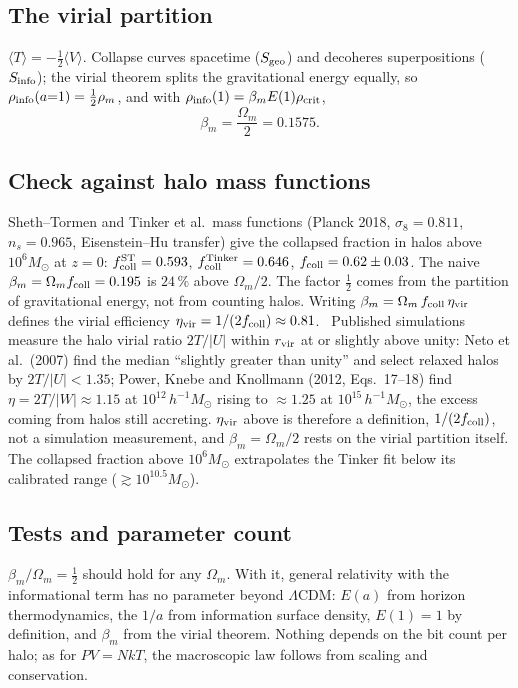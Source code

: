 \subsection{The virial partition}
$\langle T\rangle=-\tfrac12\langle V\rangle$. Collapse curves spacetime ($S_{\rm geo}$) and decoheres superpositions ($S_{\rm info}$); the virial theorem
splits the gravitational energy equally, so $\rho_{\rm info}(a{=}1)=\tfrac12\rho_m$, and with $\rho_{\rm info}(1)=\beta_mE(1)\rho_{\rm crit}$,
\begin{equation}\beta_m=\frac{\Omega_m}{2}=0.1575 .\end{equation}
\subsection{Check against halo mass functions}
Sheth--Tormen and Tinker et al.\ mass functions (Planck 2018, $\sigma_8=0.811$, $n_s=0.965$, Eisenstein--Hu transfer) give the collapsed fraction in halos
above $10^6M_\odot$ at $z=0$: $f^{\rm ST}_{\rm coll}=0.593$, $f^{\rm Tinker}_{\rm coll}=0.646$, $f_{\rm coll}=0.62\pm0.03$. The naive $\beta_m=\Omega_mf_{\rm coll}=0.195$
is $24\,\%$ above $\Omega_m/2$. The factor $\tfrac12$ comes from the partition of gravitational energy, not from counting halos. Writing
$\beta_m=\Omega_m\,f_{\rm coll}\,\eta_{\rm vir}$ defines the virial efficiency $\eta_{\rm vir}=1/(2f_{\rm coll})\approx0.81$.
\observed\ Published simulations measure the halo virial ratio $2T/|U|$ within $r_{\rm vir}$ at or slightly above unity: Neto et al.\ (2007)
find the median ``slightly greater than unity'' and select relaxed halos by $2T/|U|<1.35$; Power, Knebe and Knollmann (2012, Eqs.~17--18) find
$\eta=2T/|W|\approx1.15$ at $10^{12}\,h^{-1}M_\odot$ rising to $\approx1.25$ at $10^{15}\,h^{-1}M_\odot$, the excess coming from halos still accreting.
$\eta_{\rm vir}$ above is therefore a definition, $1/(2f_{\rm coll})$, not a simulation measurement, and $\beta_m=\Omega_m/2$ rests on the virial partition
itself. The collapsed fraction above $10^6M_\odot$ extrapolates the Tinker fit below its calibrated range ($\gtrsim10^{10.5}M_\odot$).
\subsection{Tests and parameter count}
$\beta_m/\Omega_m=\tfrac12$ should hold for any $\Omega_m$. With it, general relativity with the informational term has no parameter beyond $\Lambda$CDM: $E(a)$ from horizon thermodynamics,
the $1/a$ from information surface density, $E(1)=1$ by definition, and $\beta_m$ from the virial theorem. Nothing depends on the bit count per halo; as for
$PV=NkT$, the macroscopic law follows from scaling and conservation.

